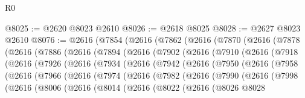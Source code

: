\begin{lexlean}{R0}
\begin{coremodule}
@8025 := @2620 @8023 @2610
@8026 := @2618 @8025
@8028 := @2627 @8023 @2610
@8076 := @2616
    (@7854
      (@2616
        (@7862
          (@2616
            (@7870
              (@2616
                (@7878
                  (@2616
                    (@7886
                      (@2616
                        (@7894
                          (@2616
                            (@7902
                              (@2616
                                (@7910
                                  (@2616
                                    (@7918
                                      (@2616
                                        (@7926
                                          (@2616
                                            (@7934
                                              (@2616
                                                (@7942
                                                  (@2616
                                                    (@7950
                                                      (@2616
                                                        (@7958
                                                          (@2616
                                                            (@7966
                                                              (@2616
                                                                (@7974
                                                                  (@2616
                                                                    (@7982
                                                                      (@2616
                                                                        (@7990
                                                                          (@2616
                                                                            (@7998
                                                                              (@2616
                                                                                (@8006
                                                                                  (@2616
                                                                                    (@8014
                                                                                      (@2616
                                                                                        (@8022
                                                                                          (@2616
                                                                                            (@8026
                                                                                              @8028

\end{coremodule}
\end{lexlean}
